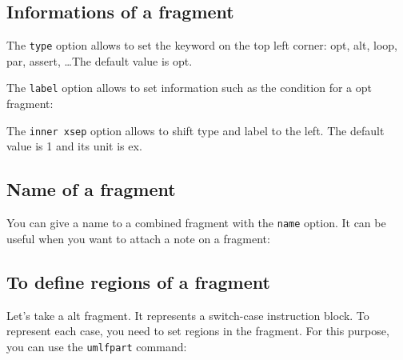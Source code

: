 \documentclass[a4paper,11pt]{report}
\begin{document}
\subsection{Informations of a fragment}\label{ss.fraginfos}

The {\tt type} option allows to set the keyword on the top left corner: opt, alt, loop, par, assert, \ldots The default value is opt.

The {\tt label} option allows to set information such as the condition for a opt fragment:

\medskip

\begin{minipage}{0.5\textwidth}

\end{minipage}
\begin{minipage}{0.5\textwidth}
\begin{center}
\end{center}
\end{minipage}

\medskip

The {\tt inner xsep} option allows to shift type and label to the left. The default value is 1 and its unit is ex.

\subsection{Name of a fragment}\label{ss.fragname}

You can give a name to a combined fragment with the {\tt name} option. It can be useful when you want to attach a note on a fragment:

\medskip

\begin{minipage}{0.5\textwidth}

\end{minipage}
\begin{minipage}{0.5\textwidth}
\begin{center}
\end{center}
\end{minipage}

\subsection{To define regions of a fragment}\label{ss.fragpart}

Let's take a alt fragment. It represents a switch-case instruction block. To represent each case, you need to set regions in the fragment. For this purpose, you can use the {\tt umlfpart} command:
\end{document}
